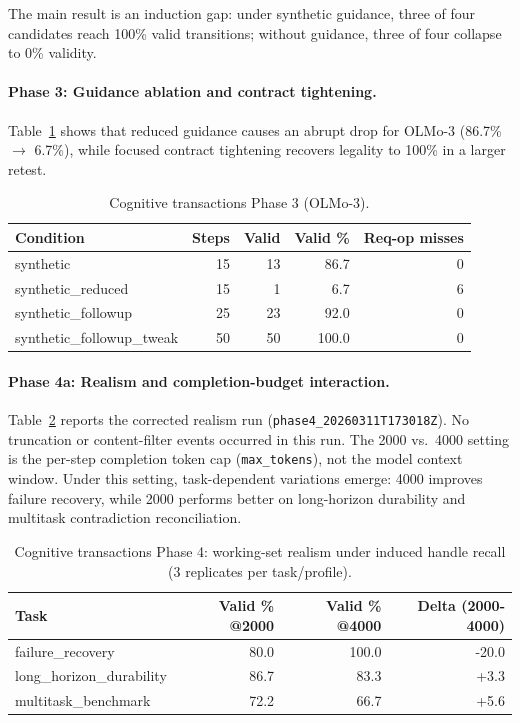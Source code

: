 The main result is an induction gap: under synthetic guidance, three of
four candidates reach 100\% valid transitions; without guidance, three of
four collapse to 0\% validity.

\paragraph{Phase 3: Guidance ablation and contract tightening.}
Table~\ref{tab:ct-phase3} shows that reduced guidance causes an abrupt
drop for OLMo-3 (86.7\% $\rightarrow$ 6.7\%), while focused contract
tightening recovers legality to 100\% in a larger retest.

\begin{table}[ht]
\centering
\caption{Cognitive transactions Phase 3 (OLMo-3).}
\label{tab:ct-phase3}
\small
\begin{tabular}{@{}lrrrr@{}}
\toprule
\textbf{Condition} & \textbf{Steps} & \textbf{Valid} & \textbf{Valid \%} & \textbf{Req-op misses} \\
\midrule
synthetic & 15 & 13 & 86.7 & 0 \\
synthetic\_reduced & 15 & 1 & 6.7 & 6 \\
synthetic\_followup & 25 & 23 & 92.0 & 0 \\
synthetic\_followup\_tweak & 50 & 50 & 100.0 & 0 \\
\bottomrule
\end{tabular}
\end{table}

\paragraph{Phase 4a: Realism and completion-budget interaction.}
Table~\ref{tab:ct-phase4} reports the corrected realism run
(\texttt{phase4\_20260311T173018Z}). No truncation or content-filter
events occurred in this run. The 2000 vs.~4000 setting is the per-step
completion token cap (\texttt{max\_tokens}), not the model context
window. Under this setting, task-dependent variations emerge:
4000 improves failure recovery, while 2000 performs better on long-horizon
durability and multitask contradiction reconciliation.

\begin{table}[ht]
\centering
\caption{Cognitive transactions Phase 4: working-set realism under induced handle recall (3 replicates per task/profile).}
\label{tab:ct-phase4}
\small
\begin{tabular}{@{}lrrr@{}}
\toprule
\textbf{Task} & \textbf{Valid \% @2000} & \textbf{Valid \% @4000} & \textbf{Delta (2000-4000)} \\
\midrule
failure\_recovery & 80.0 & 100.0 & -20.0 \\
long\_horizon\_durability & 86.7 & 83.3 & +3.3 \\
multitask\_benchmark & 72.2 & 66.7 & +5.6 \\
\bottomrule
\end{tabular}
\end{table}

